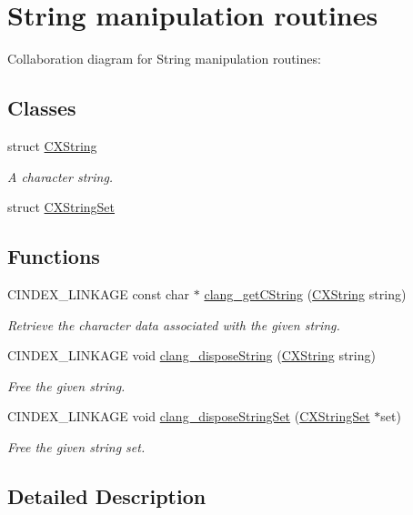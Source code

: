 \hypertarget{group__CINDEX__STRING}{}\section{String manipulation routines}
\label{group__CINDEX__STRING}
Collaboration diagram for String manipulation routines\+:
\subsection*{Classes}
\begin{DoxyCompactItemize}
\item 
struct \hyperlink{structCXString}{C\+X\+String}
\begin{DoxyCompactList}\small\item\em A character string. \end{DoxyCompactList}\item 
struct \hyperlink{structCXStringSet}{C\+X\+String\+Set}
\end{DoxyCompactItemize}
\subsection*{Functions}
\begin{DoxyCompactItemize}
\item 
\mbox{\label{group__CINDEX__STRING_gafd043aa189e990b9e327e9f95a1da8a5}} 
C\+I\+N\+D\+E\+X\+\_\+\+L\+I\+N\+K\+A\+GE const char $\ast$ \hyperlink{group__CINDEX__STRING_gafd043aa189e990b9e327e9f95a1da8a5}{clang\+\_\+get\+C\+String} (\hyperlink{structCXString}{C\+X\+String} string)
\begin{DoxyCompactList}\small\item\em Retrieve the character data associated with the given string. \end{DoxyCompactList}\item 
\mbox{\label{group__CINDEX__STRING_gaeff715b329ded18188959fab3066048f}} 
C\+I\+N\+D\+E\+X\+\_\+\+L\+I\+N\+K\+A\+GE void \hyperlink{group__CINDEX__STRING_gaeff715b329ded18188959fab3066048f}{clang\+\_\+dispose\+String} (\hyperlink{structCXString}{C\+X\+String} string)
\begin{DoxyCompactList}\small\item\em Free the given string. \end{DoxyCompactList}\item 
\mbox{\label{group__CINDEX__STRING_gabece1342b7aeba281b56edadced65ac9}} 
C\+I\+N\+D\+E\+X\+\_\+\+L\+I\+N\+K\+A\+GE void \hyperlink{group__CINDEX__STRING_gabece1342b7aeba281b56edadced65ac9}{clang\+\_\+dispose\+String\+Set} (\hyperlink{structCXStringSet}{C\+X\+String\+Set} $\ast$set)
\begin{DoxyCompactList}\small\item\em Free the given string set. \end{DoxyCompactList}\end{DoxyCompactItemize}


\subsection{Detailed Description}
